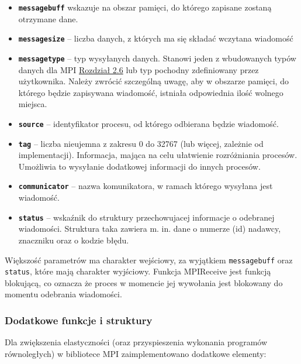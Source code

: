 \begin{itemize}
	\item \texttt{\textbf{message\textunderscore buff}} wskazuje na obszar pamięci, do którego zapisane zostaną otrzymane dane.
	\item \texttt{\textbf{message\textunderscore size}} -- liczba danych, z których ma się składać wczytana wiadomość
	\item \texttt{\textbf{message\textunderscore type}} -- typ wysyłanych danych. Stanowi jeden z wbudowanych typów danych dla MPI \hyperref[table:datatypes]{Rozdział 2.6} lub typ pochodny zdefiniowany przez użytkownika. Należy zwrócić szczególną uwagę, aby w obszarze pamięci, do którego będzie zapisywana wiadomość, istniała odpowiednia ilość wolnego miejsca.
	\item \texttt{\textbf{source}} -- identyfikator procesu, od którego odbierana będzie wiadomość.
	\item \texttt{\textbf{tag}} -- liczba nieujemna z zakresu 0 do 32767 (lub więcej, zależnie od implementacji). Informacja, mająca na celu ułatwienie rozróżniania procesów. Umożliwia to wysyłanie dodatkowej informacji do innych procesów.
	\item \texttt{\textbf{communicator}} -- nazwa komunikatora, w ramach którego wysyłana jest wiadomość.
	\item \texttt{\textbf{status}} -- wskaźnik do struktury przechowujacej informacje o odebranej wiadomości. Struktura taka zawiera m. in. dane o numerze (id) nadawcy, znaczniku oraz o kodzie błędu.
\end{itemize}

Większość parametrów ma charakter wejściowy, za wyjątkiem \texttt{message\textunderscore buff} oraz \texttt{status}, które mają charakter wyjściowy. Funkcja MPI\textunderscore Receive jest funkcją blokującą, co oznacza że proces w momencie jej wywołania jest blokowany do momentu odebrania wiadomości.

\subsubsection{Dodatkowe funkcje i struktury}

Dla zwiększenia elastyczności (oraz przyspieszenia wykonania programów równoległych) w bibliotece MPI zaimplementowano dodatkowe elementy:

